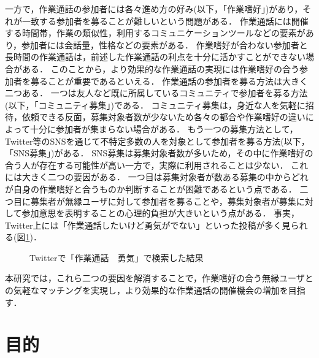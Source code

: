 一方で，作業通話の参加者には各々進め方の好み(以下，「作業嗜好」)があり，それが一致する参加者を募ることが難しいという問題がある．
作業通話には開催する時間帯，作業の類似性，利用するコミュニケーションツールなどの要素があり，参加者には会話量，性格などの要素がある．
作業嗜好が合わない参加者と長時間の作業通話は，前述した作業通話の利点を十分に活かすことができない場合がある．
このことから，より効果的な作業通話の実現には作業嗜好の合う参加者を募ることが重要であるといえる．
作業通話の参加者を募る方法は大きく二つある．
一つは友人など既に所属しているコミュニティで参加者を募る方法(以下，「コミュニティ募集」)である．
コミュニティ募集は，身近な人を気軽に招待，依頼できる反面，募集対象者数が少ないため各々の都合や作業嗜好の違いによって十分に参加者が集まらない場合がある．
もう一つの募集方法として，Twitter\cite{Twitter}等のSNSを通じて不特定多数の人を対象として参加者を募る方法(以下，「SNS募集」)がある．
SNS募集は募集対象者数が多いため，その中に作業嗜好の合う人が存在する可能性が高い一方で，実際に利用されることは少ない．
これには大きく二つの要因がある．
一つ目は募集対象者が数ある募集の中からどれが自身の作業嗜好と合うものか判断することが困難であるという点である．
二つ目に募集者が無縁ユーザに対して参加者を募ることや，募集対象者が募集に対して参加意思を表明することの心理的負担が大きいという点がある．
事実，Twitter上には「作業通話したいけど勇気がでない」といった投稿が多く見られる(図\ref{fig:search_results})．

\begin{figure}
    \centering
    \caption{Twitterで「作業通話　勇気」で検索した結果}
    \label{fig:search_results}
\end{figure}

本研究では，これら二つの要因を解消することで，作業嗜好の合う無縁ユーザとの気軽なマッチングを実現し，より効果的な作業通話の開催機会の増加を目指す．

\section{目的}

